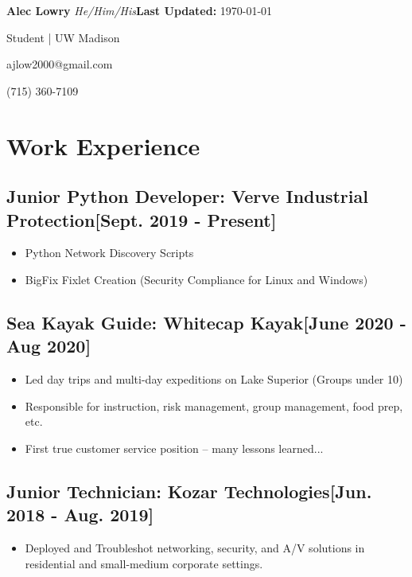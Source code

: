 \documentclass{article}
\begin{document}
\textbf{Alec Lowry} \emph{He/Him/His}\hfill{\textbf{Last Updated:} \today}

Student | UW Madison%

ajlow2000@gmail.com

(715) 360-7109

\section{ Work Experience}

    \subsection{\textbf{Junior Python Developer}: Verve Industrial Protection\hfill[Sept. 2019 - Present]}
        \begin{itemize}
            \item Python Network Discovery Scripts
            \item BigFix Fixlet Creation (Security Compliance for Linux and Windows)
        \end{itemize}

    \subsection{\textbf{Sea Kayak Guide}: Whitecap Kayak\hfill[June 2020 - Aug 2020]}
        \begin{itemize}
            \item Led day trips and multi-day expeditions on Lake Superior (Groups under 10)
            \item Responsible for instruction, risk management, group management, food prep, etc.
            \item First true customer service position -- many lessons learned...
        \end{itemize}

    \subsection{\textbf{Junior Technician}: Kozar Technologies\hfill[Jun. 2018 - Aug. 2019]}
        \begin{itemize}
            \item Deployed and Troubleshot networking, security, and A/V solutions in residential and small-medium corporate settings.
        \end{itemize}
\end{document}
